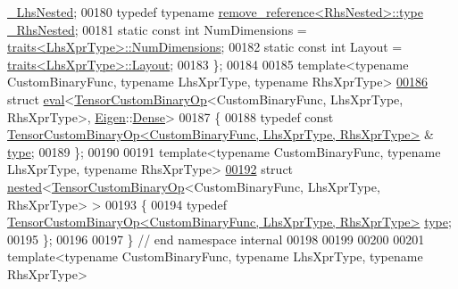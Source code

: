 \begin{DoxyCode}
      \hyperlink{group___sparse_core___module}{\_LhsNested};
00180   \textcolor{keyword}{typedef} \textcolor{keyword}{typename} \hyperlink{group___sparse_core___module}{remove\_reference<RhsNested>::type} 
      \hyperlink{group___sparse_core___module}{\_RhsNested};
00181   \textcolor{keyword}{static} \textcolor{keyword}{const} \textcolor{keywordtype}{int} NumDimensions = \hyperlink{struct_eigen_1_1internal_1_1traits}{traits<LhsXprType>::NumDimensions};
00182   \textcolor{keyword}{static} \textcolor{keyword}{const} \textcolor{keywordtype}{int} Layout = \hyperlink{struct_eigen_1_1internal_1_1traits}{traits<LhsXprType>::Layout};
00183 \};
00184 
00185 \textcolor{keyword}{template}<\textcolor{keyword}{typename} CustomBinaryFunc, \textcolor{keyword}{typename} LhsXprType, \textcolor{keyword}{typename} RhsXprType>
\hyperlink{struct_eigen_1_1internal_1_1eval_3_01_tensor_custom_binary_op_3_01_custom_binary_func_00_01_lhs_0b3fac7023a8693ad10b9b9dcfd17f7c}{00186} \textcolor{keyword}{struct }\hyperlink{struct_eigen_1_1internal_1_1eval}{eval}<\hyperlink{class_eigen_1_1_tensor_custom_binary_op}{TensorCustomBinaryOp}<CustomBinaryFunc, LhsXprType, RhsXprType>, 
      \hyperlink{namespace_eigen}{Eigen}::\hyperlink{struct_eigen_1_1_dense}{Dense}>
00187 \{
00188   \textcolor{keyword}{typedef} \textcolor{keyword}{const} \hyperlink{class_eigen_1_1_tensor_custom_binary_op}{TensorCustomBinaryOp<CustomBinaryFunc, LhsXprType, RhsXprType>}
      & \hyperlink{class_eigen_1_1_tensor_custom_binary_op}{type};
00189 \};
00190 
00191 \textcolor{keyword}{template}<\textcolor{keyword}{typename} CustomBinaryFunc, \textcolor{keyword}{typename} LhsXprType, \textcolor{keyword}{typename} RhsXprType>
\hyperlink{struct_eigen_1_1internal_1_1nested_3_01_tensor_custom_binary_op_3_01_custom_binary_func_00_01_lh0ebeaddb698d52bc5880e3a8cd1df790}{00192} \textcolor{keyword}{struct }\hyperlink{struct_eigen_1_1internal_1_1nested}{nested}<\hyperlink{class_eigen_1_1_tensor_custom_binary_op}{TensorCustomBinaryOp}<CustomBinaryFunc, LhsXprType, RhsXprType> >
00193 \{
00194   \textcolor{keyword}{typedef} \hyperlink{class_eigen_1_1_tensor_custom_binary_op}{TensorCustomBinaryOp<CustomBinaryFunc, LhsXprType, RhsXprType>}
       \hyperlink{class_eigen_1_1_tensor_custom_binary_op}{type};
00195 \};
00196 
00197 \}  \textcolor{comment}{// end namespace internal}
00198 
00199 
00200 
00201 \textcolor{keyword}{template}<\textcolor{keyword}{typename} CustomBinaryFunc, \textcolor{keyword}{typename} LhsXprType, \textcolor{keyword}{typename} RhsXprType>

\end{DoxyCode}
